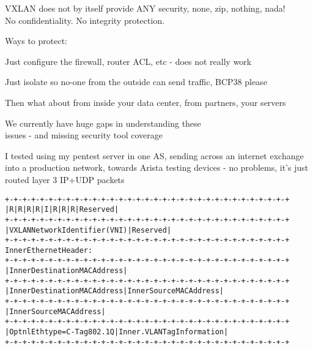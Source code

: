 \documentclass[Screen16to9,17pt]{foils}
\begin{document}


VXLAN does not by itself provide ANY security,
none, zip, nothing, nada! \\
No confidentiality. No integrity protection.

\vskip 5mm

Ways to protect:
\begin{list2}
\item Just configure the firewall, router ACL, etc - does not really work
\item Just isolate so no-one from the outside can send traffic, BCP38 please
\item Then what about from inside your data center, from partners, your servers
\end{list2}

\vskip 1cm
{\Large We currently have huge gaps in understanding these\\
issues - and missing security tool coverage}




I tested using my pentest server in one AS, sending across an internet exchange into a production network, towards Arista testing devices - no problems, it's just routed layer 3 IP+UDP packets


\begin{alltt}\footnotesize
+-+-+-+-+-+-+-+-+-+-+-+-+-+-+-+-+-+-+-+-+-+-+-+-+-+-+-+-+-+-+-+-+
|R|R|R|R|I|R|R|R|            Reserved                           |
+-+-+-+-+-+-+-+-+-+-+-+-+-+-+-+-+-+-+-+-+-+-+-+-+-+-+-+-+-+-+-+-+
|                VXLAN Network Identifier (VNI) |   Reserved    |
+-+-+-+-+-+-+-+-+-+-+-+-+-+-+-+-+-+-+-+-+-+-+-+-+-+-+-+-+-+-+-+-+
Inner Ethernet Header:
+-+-+-+-+-+-+-+-+-+-+-+-+-+-+-+-+-+-+-+-+-+-+-+-+-+-+-+-+-+-+-+-+
|             Inner Destination MAC Address                     |
+-+-+-+-+-+-+-+-+-+-+-+-+-+-+-+-+-+-+-+-+-+-+-+-+-+-+-+-+-+-+-+-+
| Inner Destination MAC Address | Inner Source MAC Address      |
+-+-+-+-+-+-+-+-+-+-+-+-+-+-+-+-+-+-+-+-+-+-+-+-+-+-+-+-+-+-+-+-+
|                Inner Source MAC Address                       |
+-+-+-+-+-+-+-+-+-+-+-+-+-+-+-+-+-+-+-+-+-+-+-+-+-+-+-+-+-+-+-+-+
|OptnlEthtype = C-Tag 802.1Q    | Inner.VLAN Tag Information    |
+-+-+-+-+-+-+-+-+-+-+-+-+-+-+-+-+-+-+-+-+-+-+-+-+-+-+-+-+-+-+-+-+
\end{alltt}
\end{document}
